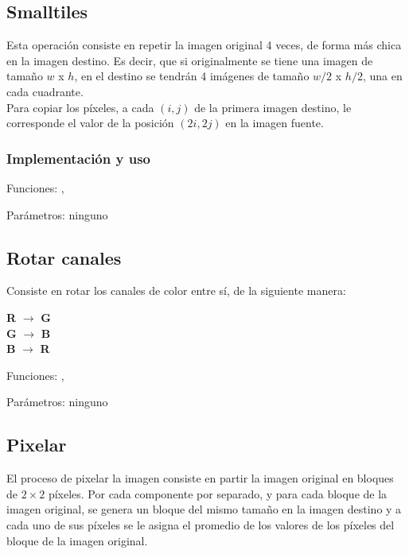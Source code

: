\subsection{Smalltiles}

Esta operaci\'on consiste en repetir la imagen original 4 veces, de forma m\'as chica en la imagen destino. 
Es decir, que si originalmente se tiene una imagen de tama\~no $w$ x $h$, en el destino se tendr\'an 4 im\'agenes 
de tama\~no $w/2$ x $h/2$, una en cada cuadrante. \\


Para copiar los p\'ixeles, a cada $(i, j)$ de la primera imagen destino, le corresponde el valor de la posici\'on $(2i, 2j)$ en la imagen fuente.\\


\subsubsection*{Implementación y uso}

\noindent Funciones: ,  

\noindent Parámetros: ninguno

\subsection{Rotar canales}

Consiste en rotar los canales de color entre sí, de la siguiente manera:
\begin{center}
\textbf{R} $\longrightarrow$ \textbf{G}\\
\textbf{G} $\longrightarrow$ \textbf{B}\\
\textbf{B} $\longrightarrow$ \textbf{R}\\
\end{center}

\noindent Funciones: ,   

\noindent Parámetros: ninguno


\subsection{Pixelar}

El proceso de pixelar la imagen consiste en partir la imagen original en 
bloques de $2\times2$ píxeles. Por cada componente por separado, y para cada bloque de la imagen original, se genera 
un bloque del mismo tama\~no en la imagen destino y a cada uno de sus píxeles se
le asigna el promedio de los valores de los píxeles del bloque de la imagen 
original.\\

